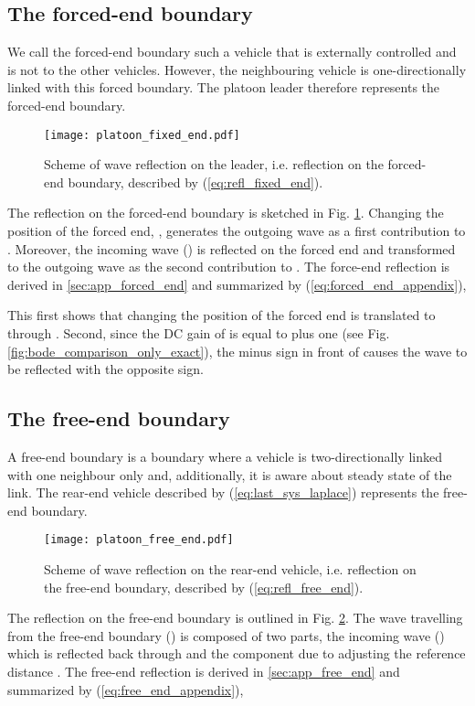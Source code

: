 \documentclass[final,5p,times,twocolumn]{elsarticle}
\begin{document}
\subsection{The forced-end boundary}
\label{sec:forced_end_boundary}
We call the forced-end boundary such a vehicle that is externally controlled and is not to the other vehicles. However, the neighbouring vehicle is one-directionally linked with this forced boundary. The platoon leader therefore represents the forced-end boundary.
\begin{figure}[htb]\centering
 \texttt{[image: platoon\_fixed\_end.pdf]}
  \caption{Scheme of wave reflection on the leader, i.e. reflection on the forced-end boundary, described by (\ref{eq:refl_fixed_end}).}
  \label{fig:fixed_end}
\end{figure}
The reflection on the forced-end boundary is sketched in Fig. \ref{fig:fixed_end}. Changing the position of the forced end, , generates the outgoing wave as a first contribution to . Moreover, the incoming wave () is reflected on the forced end and transformed to the outgoing wave as the second contribution to . The force-end reflection is derived in \ref{sec:app_forced_end} and summarized by (\ref{eq:forced_end_appendix}),

This first shows that changing the position of the forced end is translated to  through . Second, since the DC gain of  is equal to plus one (see Fig. \ref{fig:bode_comparison_only_exact}), the minus sign in front of  causes the wave to be reflected with the opposite sign.

\subsection{The free-end boundary}
\label{sec:free_end_boundary}
A free-end boundary is a boundary where a vehicle is two-directionally linked with one neighbour only and, additionally, it is aware about steady state of the link. The rear-end vehicle described by (\ref{eq:last_sys_laplace}) represents the free-end boundary.

\begin{figure}[ht]
 \centering
  \texttt{[image: platoon\_free\_end.pdf]}
  \caption{Scheme of wave reflection on the rear-end vehicle, i.e. reflection on the free-end boundary, described by (\ref{eq:refl_free_end}).}
  \label{fig:free_end}
\end{figure}

The reflection on the free-end boundary is outlined in Fig. \ref{fig:free_end}. The wave travelling from the free-end boundary () is composed of two parts, the incoming wave () which is reflected back through  and the component due to adjusting the reference distance . The free-end reflection is derived in \ref{sec:app_free_end} and summarized by (\ref{eq:free_end_appendix}),
\end{document}
